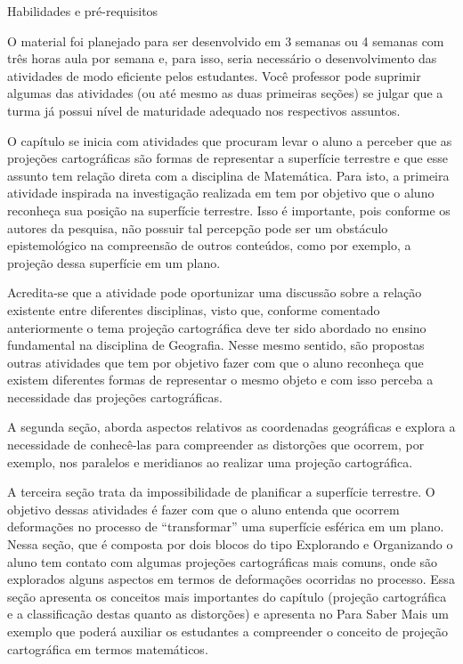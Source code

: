 \begin{apresentacao}{Habilidades e pré-requisitos}
{O material foi planejado para ser desenvolvido em 3 semanas ou 4 semanas com três horas aula por semana e, para isso, seria necessário o desenvolvimento das atividades de modo eficiente pelos estudantes. Você  professor pode suprimir  algumas das atividades (ou até mesmo as duas primeiras seções) se julgar que a turma já possui nível de maturidade adequado nos respectivos assuntos.

O capítulo se inicia com atividades que procuram levar o aluno a perceber que as projeções cartográficas são formas de representar a superfície terrestre e que esse assunto tem relação direta com a disciplina de Matemática. Para isto, a primeira atividade inspirada na investigação realizada em \citep{Nussbaum} tem por objetivo que o aluno reconheça sua posição na superfície terrestre. Isso é importante, pois conforme os autores da pesquisa, não possuir tal percepção pode ser um obstáculo epistemológico na compreensão de outros conteúdos, como por exemplo, a projeção dessa superfície em um plano. 

Acredita-se que a atividade pode oportunizar uma discussão sobre a relação existente entre diferentes disciplinas, visto que, conforme comentado anteriormente o tema projeção cartográfica deve ter sido abordado no ensino fundamental na disciplina de Geografia. Nesse mesmo sentido, são propostas outras atividades que tem por objetivo fazer com que o aluno  reconheça que existem diferentes formas de representar o mesmo objeto e com isso perceba a necessidade das projeções cartográficas. 

A segunda seção, aborda aspectos relativos as coordenadas geográficas e explora a necessidade de conhecê-las para compreender as distorções que ocorrem, por exemplo, nos paralelos e meridianos ao realizar uma  projeção cartográfica.

A terceira seção trata da impossibilidade de planificar a superfície terrestre. O objetivo dessas atividades é fazer com que o aluno entenda que ocorrem deformações no processo de “transformar” uma superfície esférica em um plano. Nessa seção, que é composta por dois blocos do tipo Explorando e Organizando o aluno tem contato com algumas projeções cartográficas mais comuns, onde são explorados alguns aspectos em termos de deformações ocorridas no processo. Essa seção apresenta os conceitos mais  importantes do capítulo (projeção cartográfica e a classificação destas quanto as distorções) e apresenta no Para Saber Mais um exemplo que poderá auxiliar os estudantes a compreender o conceito de projeção cartográfica em termos matemáticos. 

}
\end{apresentacao}
